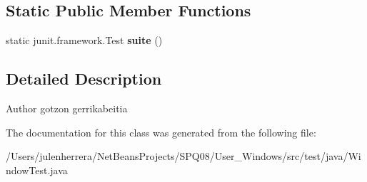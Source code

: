 \subsection*{Static Public Member Functions}
\begin{DoxyCompactItemize}
\item 
\mbox{\label{class_window_test_a9bfa34fca0329b5c82ed55f5d6732d3c}} 
static junit.\+framework.\+Test {\bfseries suite} ()
\end{DoxyCompactItemize}


\subsection{Detailed Description}
\begin{DoxyAuthor}{Author}
gotzon gerrikabeitia 
\end{DoxyAuthor}


The documentation for this class was generated from the following file\+:\begin{DoxyCompactItemize}
\item 
/\+Users/julenherrera/\+Net\+Beans\+Projects/\+S\+P\+Q08/\+User\+\_\+\+Windows/src/test/java/Window\+Test.\+java\end{DoxyCompactItemize}
